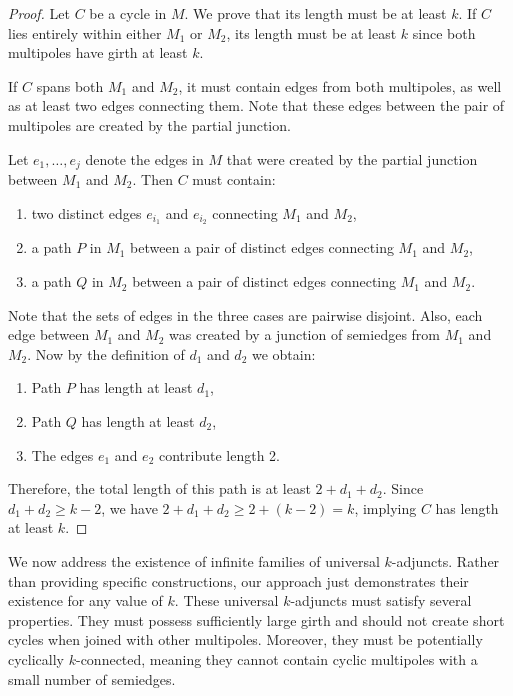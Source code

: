 \documentclass[12pt, twoside]{book}
\begin{document}
\begin{proof}
	Let $C$ be a cycle in $M$. We prove that its length must be at least $k$. If $C$ lies entirely within either $M_1$ or $M_2$, its length must be at least $k$ since both multipoles have girth at least $k$.
	
	If $C$ spans both $M_1$ and $M_2$, it must contain edges from both multipoles, as well as at least two edges connecting them. Note that these edges between the pair of multipoles are created by the partial junction.
	
	Let $e_1,\dots,e_j$ denote the edges in $M$ that were created by the partial junction between $M_1$ and $M_2$. Then $C$ must contain:
	\begin{enumerate}[label=(\roman*)]
		\item two distinct edges $e_{i_1}$ and $e_{i_2}$ connecting $M_1$ and $M_2$,
		\item a path $P$ in $M_1$ between a pair of distinct edges connecting $M_1$ and $M_2$,
		\item a path $Q$ in $M_2$ between a pair of distinct edges connecting $M_1$ and $M_2$.
	\end{enumerate}
	Note that the sets of edges in the three cases are pairwise disjoint. Also, each edge between $M_1$ and $M_2$ was created by a junction of semiedges from $M_1$ and $M_2$. Now by the definition of $d_1$ and $d_2$ we obtain:
	
	\begin{enumerate}[label=(\roman*)]
		\item Path $P$ has length at least $d_1$,
		\item Path $Q$ has length at least $d_2$,
		\item The edges $e_1$ and $e_2$ contribute length 2.
	\end{enumerate}
	
	Therefore, the total length of this path is at least $2+d_1+d_2$. Since $d_1+d_2\geq k-2$, we have $2+d_1+d_2\geq 2+(k-2)=k$, implying $C$ has length at least $k$.
\end{proof}

We now address the existence of infinite families of universal $k$-adjuncts. Rather than providing specific constructions, our approach just demonstrates their existence for any value of $k$. These universal $k$-adjuncts must satisfy several properties. They must possess sufficiently large girth and should not create short cycles when joined with other multipoles. Moreover, they must be potentially cyclically $k$-connected, meaning they cannot contain cyclic multipoles with a small number of semiedges.
\end{document}
